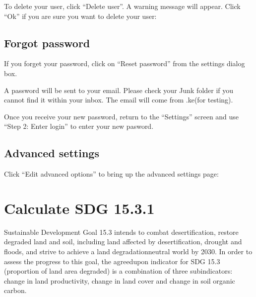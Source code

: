 \documentclass[letterpaper,10pt,english]{sphinxmanual}
\begin{document}
\sphinxAtStartPar
To delete your user, click “Delete user”. A warning message will appear. Click
“Ok” if you are sure you want to delete your user:


\section{Forgot password}
\label{\detokenize{Qgis_Plugin/Registration:forgot-password}}
\sphinxAtStartPar
If you forget your password, click on “Reset password” from the settings dialog
box.

\sphinxAtStartPar
A password will be sent to your email. Please check your Junk folder if you
cannot find it within your inbox. The email will come from .ke(for testing).

\sphinxAtStartPar
Once you receive your new password, return to the “Settings” screen and use
“Step 2: Enter login” to enter your new pasword.



\section{Advanced settings}
\label{\detokenize{Qgis_Plugin/Registration:advanced-settings}}
\sphinxAtStartPar
Click “Edit advanced options” to bring up the advanced settings page:


\sphinxstepscope


\chapter{Calculate SDG 15.3.1}
\label{\detokenize{Qgis_Plugin/Calculate_sdg15:calculate-sdg-15-3-1}}\label{\detokenize{Qgis_Plugin/Calculate_sdg15::doc}}



\sphinxAtStartPar
Sustainable Development Goal 15.3 intends to combat desertification, restore
degraded land and soil, including land affected by desertification, drought and
floods, and strive to achieve a land degradation\sphinxhyphen{}neutral world by 2030. In
order to assess the progress to this goal, the agreed\sphinxhyphen{}upon indicator for SDG
15.3 (proportion of land area degraded) is a combination of three
sub\sphinxhyphen{}indicators: change in land productivity, change in land cover and change
in soil organic carbon.
\end{document}
